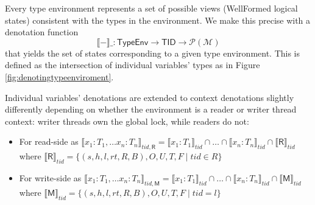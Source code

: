 Every type environment represents a set of possible views (\textsf{WellFormed} logical states) consistent with the types in the environment. We make this precise with a denotation function
\[\llbracket-\rrbracket\_ : \mathsf{TypeEnv}\rightarrow\mathsf{TID}\rightarrow\mathcal{P}(\mathcal{M})\]
that yields the set of states corresponding to a given type environment. This is defined as the intersection of individual variables' types as in Figure \ref{fig:denotingtypeenviroment}.
%

Individual variables' denotations are extended to context denotations slightly differently depending on whether the environment is a reader or writer thread context: writer threads own the global lock, while readers do not:
\begin{itemize}
\item For read-side as $\llbracket x_1 : T_1, \ldots x_n : T_n \rrbracket_{tid,\textsf{R}} = \llbracket x_1 : T_1 \rrbracket_{tid} \cap \ldots \cap \llbracket x_n : T_n \rrbracket_{tid} \cap \llbracket \textsf{R} \rrbracket_{tid}$ where
$\llbracket \textsf{R} \rrbracket_{tid} = \{ (s,h,l,rt,R,B),O,U,T,F  \mid tid \in R \}$

\item For write-side as $\llbracket x_1 : T_1, \ldots x_n : T_n \rrbracket_{tid,\textsf{M}} = \llbracket x_1 : T_1 \rrbracket_{tid} \cap \ldots \cap \llbracket x_n : T_n \rrbracket_{tid} \cap \llbracket \textsf{M} \rrbracket_{tid}$ where
$\llbracket \textsf{M} \rrbracket_{tid} = \{ (s,h,l,rt,R,B),O,U,T,F  \mid tid = l \}$
%
\end{itemize}

